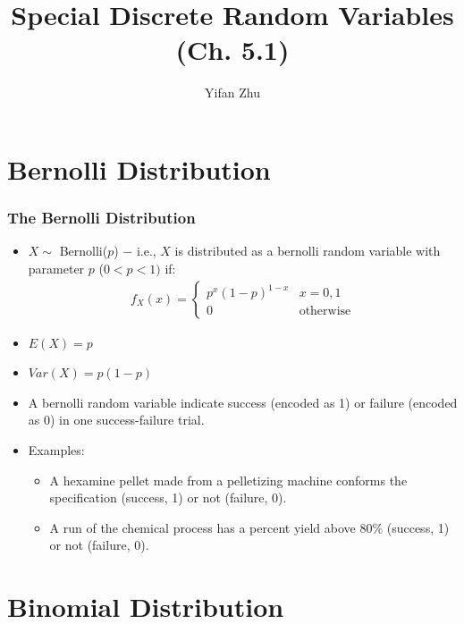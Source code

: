 \documentclass[handout]{beamer}\usepackage[]{graphicx}\usepackage[]{color}
\title{Special Discrete Random Variables (Ch. 5.1)}
\author{Yifan Zhu}
\date{}
\institute{Iowa State University}
\numberwithin{equation}{section}
\begin{document}
\begin{frame}
\titlepage
 \end{frame}
 

\section{Bernolli Distribution}
\begin{frame}
\frametitle{The Bernolli Distribution}
\begin{itemize}
\pause \item $X \sim$ Bernolli($p$) $-$ i.e., $X$ is distributed as a bernolli random variable with parameter $p$ ($0 < p < 1)$ if:
\pause \begin{align*}
f_X(x) = 
\begin{cases}
p^x (1-p)^{1-x} & x = 0,1\\
0 & \text{otherwise} 
\end{cases}
\end{align*}
\pause \item $E(X) = p$
\pause \item $Var(X) = p(1-p)$
\item 
A bernolli random variable indicate success (encoded as 1) or failure (encoded as 0) in one success-failure trial.
\item 
Examples:
\begin{itemize}
\item
A hexamine pellet made from a pelletizing machine conforms the specification (success, 1) or not (failure, 0).
\item
A run of the chemical process has a percent yield above 80\% (success, 1) or not (failure, 0).
\end{itemize}
\end{itemize}
\end{frame}



\section{Binomial Distribution}
\end{document}

